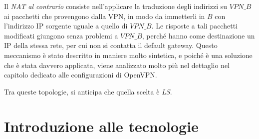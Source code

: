 Il \textit{NAT al contrario} consiste nell'applicare la traduzione degli indirizzi su $VPN\_B$
ai pacchetti che provengono dalla VPN, in modo da immetterli in $B$ con l'indirizzo IP
sorgente uguale a quello di $VPN\_B$. Le risposte a tali pacchetti modificati giungono 
senza problemi a $VPN\_B$, perché hanno come destinazione un IP della stessa rete, per cui non
si contatta il default gateway.
Questo meccanismo è stato descritto in maniere molto sintetica, e poiché è una soluzione che è stata
davvero applicata, viene analizzato molto più nel dettaglio nel capitolo dedicato alle configurazioni
di OpenVPN.

Tra queste topologie, si anticipa che quella scelta è \textit{LS}.



\section{Introduzione alle tecnologie}

